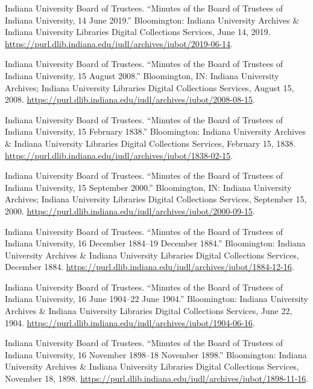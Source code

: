 \documentclass[
  american,
  letterpaper,
]{scrreprt}
\newlength{\cslhangindent}
\newenvironment{CSLReferences}[2] %
 {\begin{list}{}{%
  \setlength{\itemindent}{0pt}
  \setlength{\leftmargin}{0pt}
  \setlength{\parsep}{0pt}
  \ifodd #1
   \setlength{\leftmargin}{\cslhangindent}
   \setlength{\itemindent}{-1\cslhangindent}
  \fi
  \setlength{\itemsep}{#2\baselineskip}}}
 {\end{list}}
\begin{document}
\begin{CSLReferences}{1}{0}
Indiana University Board of Trustees. {``Minutes of the Board of
Trustees of Indiana University, 14 June 2019.''} Bloomington: Indiana
University Archives \& Indiana University Libraries Digital Collections
Services, June 14, 2019.
\url{https://purl.dlib.indiana.edu/iudl/archives/iubot/2019-06-14}.

Indiana University Board of Trustees. {``Minutes of the Board of
Trustees of Indiana University, 15 August 2008.''} Bloomington, IN:
Indiana University Archives; Indiana University Libraries Digital
Collections Services, August 15, 2008.
\url{https://purl.dlib.indiana.edu/iudl/archives/iubot/2008-08-15}.

Indiana University Board of Trustees. {``Minutes of the Board of
Trustees of Indiana University, 15 February 1838.''} Bloomington:
Indiana University Archives \& Indiana University Libraries Digital
Collections Services, February 15, 1838.
\url{https://purl.dlib.indiana.edu/iudl/archives/iubot/1838-02-15}.

Indiana University Board of Trustees. {``Minutes of the Board of
Trustees of Indiana University, 15 September 2000.''} Bloomington, IN:
Indiana University Archives; Indiana University Libraries Digital
Collections Services, September 15, 2000.
\url{https://purl.dlib.indiana.edu/iudl/archives/iubot/2000-09-15}.

Indiana University Board of Trustees. {``Minutes of the Board of
Trustees of Indiana University, 16 December 1884--19 December 1884.''}
Bloomington: Indiana University Archives \& Indiana University Libraries
Digital Collections Services, December 1884.
\url{https://purl.dlib.indiana.edu/iudl/archives/iubot/1884-12-16}.

Indiana University Board of Trustees. {``Minutes of the Board of
Trustees of Indiana University, 16 June 1904--22 June 1904.''}
Bloomington: Indiana University Archives \& Indiana University Libraries
Digital Collections Services, June 22, 1904.
\url{https://purl.dlib.indiana.edu/iudl/archives/iubot/1904-06-16}.

Indiana University Board of Trustees. {``Minutes of the Board of
Trustees of Indiana University, 16 November 1898--18 November 1898.''}
Bloomington: Indiana University Archives \& Indiana University Libraries
Digital Collections Services, November 18, 1898.
\url{https://purl.dlib.indiana.edu/iudl/archives/iubot/1898-11-16}.


\end{CSLReferences}
\end{document}
